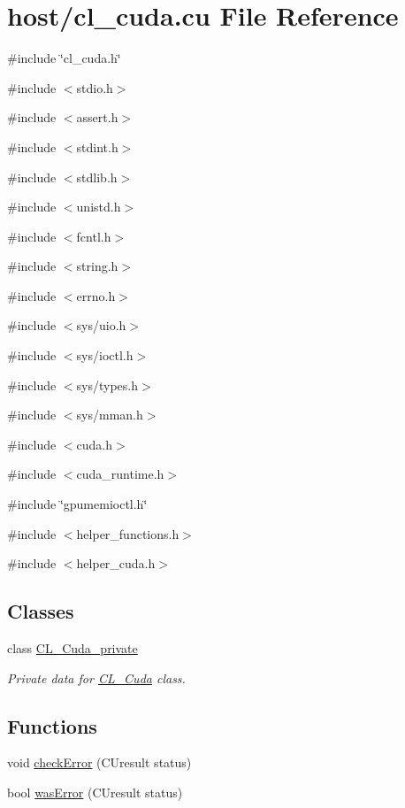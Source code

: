 \hypertarget{cl__cuda_8cu}{
\section{host/cl\_\-cuda.cu File Reference}
\label{cl__cuda_8cu}
}
{\ttfamily \#include \char`\"{}cl\_\-cuda.h\char`\"{}}\par
{\ttfamily \#include $<$stdio.h$>$}\par
{\ttfamily \#include $<$assert.h$>$}\par
{\ttfamily \#include $<$stdint.h$>$}\par
{\ttfamily \#include $<$stdlib.h$>$}\par
{\ttfamily \#include $<$unistd.h$>$}\par
{\ttfamily \#include $<$fcntl.h$>$}\par
{\ttfamily \#include $<$string.h$>$}\par
{\ttfamily \#include $<$errno.h$>$}\par
{\ttfamily \#include $<$sys/uio.h$>$}\par
{\ttfamily \#include $<$sys/ioctl.h$>$}\par
{\ttfamily \#include $<$sys/types.h$>$}\par
{\ttfamily \#include $<$sys/mman.h$>$}\par
{\ttfamily \#include $<$cuda.h$>$}\par
{\ttfamily \#include $<$cuda\_\-runtime.h$>$}\par
{\ttfamily \#include \char`\"{}gpumemioctl.h\char`\"{}}\par
{\ttfamily \#include $<$helper\_\-functions.h$>$}\par
{\ttfamily \#include $<$helper\_\-cuda.h$>$}\par
\subsection*{Classes}
\begin{DoxyCompactItemize}
\item 
class \hyperlink{classCL__Cuda__private}{CL\_\-Cuda\_\-private}
\begin{DoxyCompactList}\small\item\em Private data for \hyperlink{classCL__Cuda}{CL\_\-Cuda} class. \item\end{DoxyCompactList}\end{DoxyCompactItemize}
\subsection*{Functions}
\begin{DoxyCompactItemize}
\item 
void \hyperlink{cl__cuda_8cu_a6367bddb9bffa83d7bcf228def049b49}{checkError} (CUresult status)
\item 
bool \hyperlink{cl__cuda_8cu_a122aefe5eab9c7fdf0d6710df7eefae5}{wasError} (CUresult status)
\end{DoxyCompactItemize}


